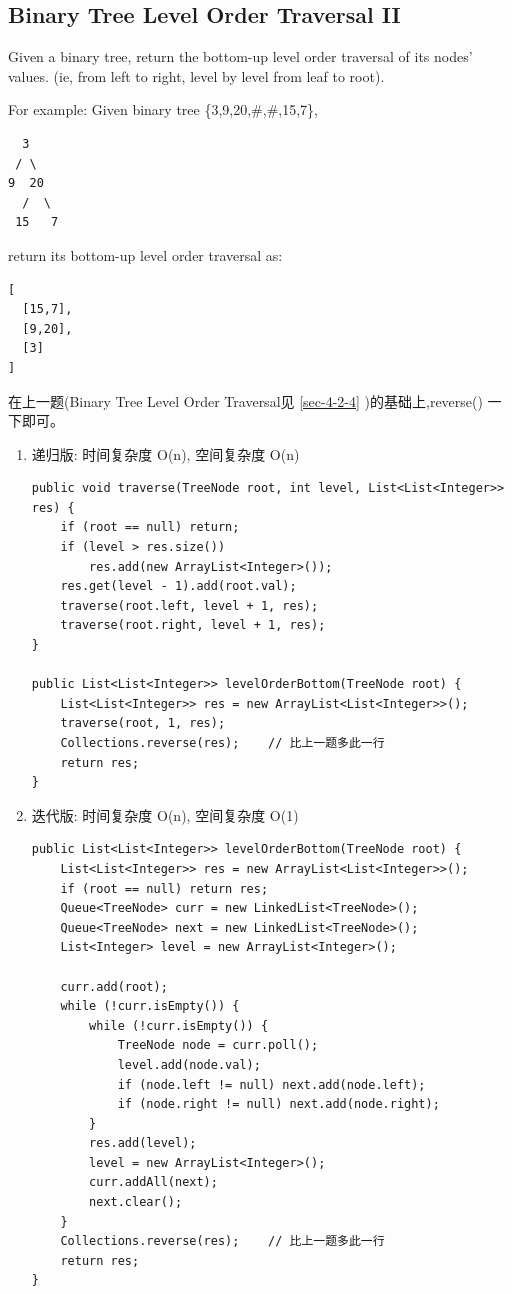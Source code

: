 \documentclass[12pt]{book}
\begin{document}
\subsection{Binary Tree Level Order Traversal II}
\label{sec-4-2-5}
Given a binary tree, return the bottom-up level order traversal of its nodes' values. (ie, from left to right, level by level from leaf to root).

For example:
Given binary tree \{3,9,20,\#,\#,15,7\},
\lstset{language=java,label= ,caption= ,numbers=none}
\begin{lstlisting}
  3
 / \
9  20
  /  \
 15   7
\end{lstlisting}
return its bottom-up level order traversal as:
\lstset{language=java,label= ,caption= ,numbers=none}
\begin{lstlisting}
[
  [15,7],
  [9,20],
  [3]
]
\end{lstlisting}

在上一题(Binary Tree Level Order Traversal见 \ref{sec-4-2-4} )的基础上,reverse() 一下即可。

\begin{enumerate}
\item 递归版: 时间复杂度 O(n), 空间复杂度 O(n)
\label{sec-4-2-5-1}


\lstset{language=java,label= ,caption= ,numbers=none}
\begin{lstlisting}
public void traverse(TreeNode root, int level, List<List<Integer>> res) {
    if (root == null) return;
    if (level > res.size())
        res.add(new ArrayList<Integer>());
    res.get(level - 1).add(root.val);
    traverse(root.left, level + 1, res);
    traverse(root.right, level + 1, res);
}

public List<List<Integer>> levelOrderBottom(TreeNode root) {
    List<List<Integer>> res = new ArrayList<List<Integer>>();
    traverse(root, 1, res);
    Collections.reverse(res);    // 比上一题多此一行
    return res;
}
\end{lstlisting}

\item 迭代版: 时间复杂度 O(n), 空间复杂度 O(1)
\label{sec-4-2-5-2}


\lstset{language=java,label= ,caption= ,numbers=none}
\begin{lstlisting}
public List<List<Integer>> levelOrderBottom(TreeNode root) {
    List<List<Integer>> res = new ArrayList<List<Integer>>();
    if (root == null) return res;
    Queue<TreeNode> curr = new LinkedList<TreeNode>();
    Queue<TreeNode> next = new LinkedList<TreeNode>();
    List<Integer> level = new ArrayList<Integer>();

    curr.add(root);
    while (!curr.isEmpty()) {
        while (!curr.isEmpty()) {
            TreeNode node = curr.poll();
            level.add(node.val);
            if (node.left != null) next.add(node.left);
            if (node.right != null) next.add(node.right);
        }
        res.add(level);
        level = new ArrayList<Integer>();
        curr.addAll(next);
        next.clear();
    }
    Collections.reverse(res);    // 比上一题多此一行
    return res;
}
\end{lstlisting}
\end{enumerate}
\end{document}
